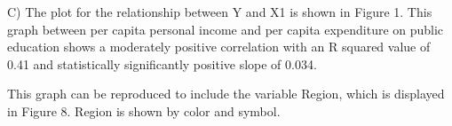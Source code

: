 \documentclass[12pt,letterpaper]{article}
\begin{document}
\vspace{.5cm}

  

\vspace{.5cm}

\noindent C) The plot for the relationship between Y and X1 is shown in Figure 1. This graph between per capita personal income and per capita expenditure on public education shows a moderately positive correlation with an R squared value of 0.41 and statistically significantly positive slope of 0.034.

\vspace{.5cm}

  

\vspace{.5cm}
\noindent This graph can be reproduced to include the variable Region, which is displayed in Figure 8. Region is shown by color and symbol.

\vspace{.5cm}

 

\vspace{.5cm}

 

\vspace{.5cm}

 

\vspace{.5cm}
\end{document}
